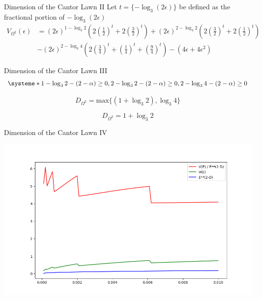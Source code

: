 \documentclass{if-beamer}
\newcommand{\Om}{\Omega}
\begin{document}
\begin{frame}{Dimension of the Cantor Lawn II}
	Let $\displaystyle t = \{-\log_3 (2\epsilon)\}$ be defined as the fractional portion of $-\log_3 (2\epsilon)$ 
	\begin{align*}
		\displaystyle
		V_{\Om^2}(\epsilon) &= (2\epsilon)^{1 - \log_3 2} \left( 2\left(\frac{1}{2}\right)^t + 2\left(\frac{3}{2}\right)^t \right) + (2\epsilon)^{2- \log_3 2} \left( 2\left(\frac{3}{2}\right)^t + 2\left(\frac{1}{2}\right)^t \right) \\
		& - (2\epsilon)^{2- \log_3 4} \left( 2\left(\frac{3}{4}\right)^t + \left(\frac{1}{4}\right)^t + \left(\frac{9}{4}\right)^t \right) - (4\epsilon + 4\epsilon^2)
	\end{align*}
	\pause
	
\end{frame}

\begin{frame}{Dimension of the Cantor Lawn III}
\[ 
\displaystyle \systeme*{1 - \log_3 2 - (2 - \alpha) \geq 0, 2 - \log_3 2 - (2 - \alpha) \geq 0, 2 - \log_3 4 - (2 - \alpha) \geq 0}
\]
\pause

\[ 
\displaystyle D_{\Om^2} = \text{max} \{ (1 + \log_3 2), \log_3 4 \}
\]
\pause

\[ 
\displaystyle D_{\Om^2} = 1 + \log_3 2
\]
\end{frame}

\begin{frame}{Dimension of the Cantor Lawn IV}
	\begin{center}
		\includegraphics[scale=0.40]{CantorLawnVolumesPlot.png}
	\end{center}
\end{frame}
\end{document}
